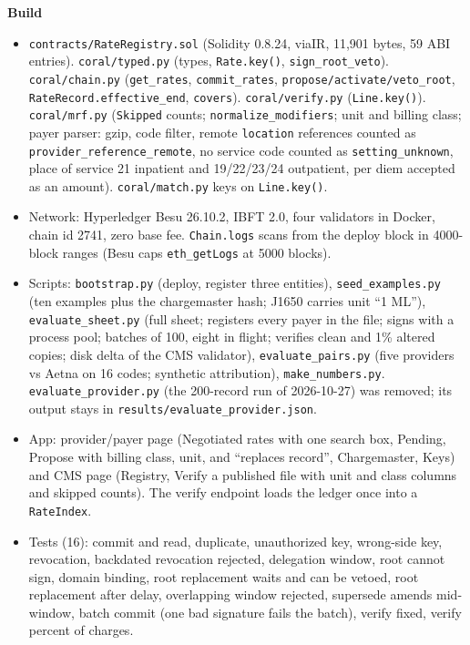 \textbf{Build}
\begin{itemize}
\item \texttt{contracts/RateRegistry.sol} (Solidity 0.8.24, viaIR, 11,901 bytes, 59 ABI entries). \texttt{coral/typed.py} (types, \texttt{Rate.key()}, \texttt{sign\_root\_veto}). \texttt{coral/chain.py} (\texttt{get\_rates}, \texttt{commit\_rates}, \texttt{propose/activate/veto\_root}, \texttt{RateRecord.effective\_end}, \texttt{covers}). \texttt{coral/verify.py} (\texttt{Line.key()}). \texttt{coral/mrf.py} (\texttt{Skipped} counts; \texttt{normalize\_modifiers}; unit and billing class; payer parser: gzip, code filter, remote \texttt{location} references counted as \texttt{provider\_reference\_remote}, no service code counted as \texttt{setting\_unknown}, place of service 21 inpatient and 19/22/23/24 outpatient, per diem accepted as an amount). \texttt{coral/match.py} keys on \texttt{Line.key()}.
\item Network: Hyperledger Besu 26.10.2, IBFT 2.0, four validators in Docker, chain id 2741, zero base fee. \texttt{Chain.logs} scans from the deploy block in 4000-block ranges (Besu caps \texttt{eth\_getLogs} at 5000 blocks).
\item Scripts: \texttt{bootstrap.py} (deploy, register three entities), \texttt{seed\_examples.py} (ten examples plus the chargemaster hash; J1650 carries unit ``1 ML''), \texttt{evaluate\_sheet.py} (full sheet; registers every payer in the file; signs with a process pool; batches of 100, eight in flight; verifies clean and 1\% altered copies; disk delta of the CMS validator), \texttt{evaluate\_pairs.py} (five providers vs Aetna on 16 codes; synthetic attribution), \texttt{make\_numbers.py}. \texttt{evaluate\_provider.py} (the 200-record run of 2026-10-27) was removed; its output stays in \texttt{results/evaluate\_provider.json}.
\item App: provider/payer page (Negotiated rates with one search box, Pending, Propose with billing class, unit, and ``replaces record'', Chargemaster, Keys) and CMS page (Registry, Verify a published file with unit and class columns and skipped counts). The verify endpoint loads the ledger once into a \texttt{RateIndex}.
\item Tests (16): commit and read, duplicate, unauthorized key, wrong-side key, revocation, backdated revocation rejected, delegation window, root cannot sign, domain binding, root replacement waits and can be vetoed, root replacement after delay, overlapping window rejected, supersede amends mid-window, batch commit (one bad signature fails the batch), verify fixed, verify percent of charges.
\end{itemize}

